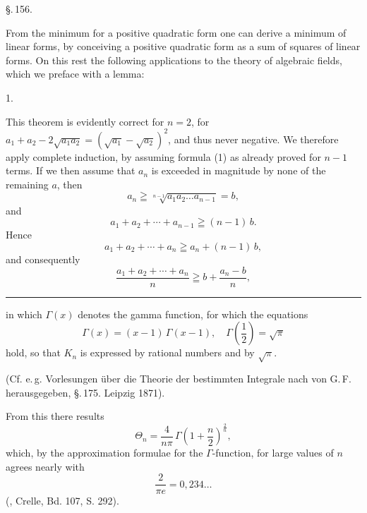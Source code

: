 
\begin{center}
\S.\,156.

\end{center}

From the minimum for a positive quadratic form one can
derive a minimum of linear forms, by conceiving a positive
quadratic form as a sum of squares of linear forms. On this
rest the following applications to the theory of algebraic
fields, which we preface with a lemma:

1. 

This theorem is evidently correct for $n=2$, for
$a_1 + a_2 - 2\sqrt{a_1 a_2} = (\sqrt{a_1} - \sqrt{a_2})^2$, and thus never negative. We
therefore apply complete induction, by assuming formula
(1) as already proved for $n-1$ terms. If we then assume
that $a_n$ is exceeded in magnitude by none of the remaining
$a$, then
\[ a_n \geqq \sqrt[n-1]{a_1 a_2 \ldots a_{n-1}} = b, \]
and
\[ a_1 + a_2 + \cdots + a_{n-1} \geqq (n-1)\,b. \]
Hence
\[ a_1 + a_2 + \cdots + a_n \geqq a_n + (n-1)\,b, \]
and consequently
\[ \frac{a_1 + a_2 + \cdots + a_n}{n} \geqq b + \frac{a_n - b}{n}, \]

\begin{footnotesize}
\noindent\rule{4cm}{0.4pt}

in which $\Gamma(x)$ denotes the gamma function, for which the equations
\[ \Gamma(x) = (x-1)\,\Gamma(x-1), \quad \Gamma\left(\frac{1}{2}\right) = \sqrt{\pi} \]
hold, so that $K_n$ is expressed by rational numbers and by
$\sqrt{\pi}$.

(Cf. e.\,g. Vorlesungen \"uber die Theorie der bestimmten Integrale
nach  von G.\,F.  herausgegeben, \S.\,175.
Leipzig 1871).

From this there results
\[ \Theta_n = \frac{4}{n\pi}\,\Gamma\left(1 + \frac{n}{2}\right)^{\frac{2}{n}}, \]
which, by the approximation formulae for the $\Gamma$-function, for large
values of $n$ agrees nearly with
\[ \frac{2}{\pi e} = 0{,}234\ldots \]
(, Crelle, Bd. 107, S. 292).
\end{footnotesize}
